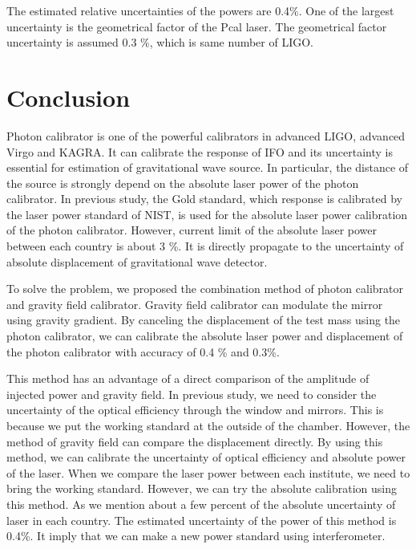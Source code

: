 \documentclass[A4]{spie}  %
\begin{document}
The estimated relative uncertainties of the powers are 0.4\%. One of the largest uncertainty is the geometrical factor of the Pcal laser. The geometrical factor uncertainty is assumed 0.3 \%, which is same number of LIGO. 

\section{Conclusion}
Photon calibrator is one of the powerful calibrators in advanced LIGO, advanced Virgo and KAGRA. It can calibrate the response of IFO and its uncertainty is essential for estimation of gravitational wave source. In particular, the distance of the source is strongly depend on the absolute laser power of the photon calibrator. In previous study, the Gold standard, which response is calibrated by the laser power standard of NIST, is used for the absolute laser power calibration of the photon calibrator. However, current limit of the absolute laser power between each country is about 3 \%. It is directly propagate to the uncertainty of absolute displacement of gravitational wave detector.

To solve the problem, we proposed the combination method of photon calibrator and gravity field calibrator. Gravity field calibrator can modulate the mirror using gravity gradient. By canceling the displacement of the test mass using the photon calibrator, we can calibrate the absolute laser power and displacement of the photon calibrator with accuracy of 0.4 \% and 0.3\%.

This method has an advantage of a direct comparison of the amplitude of injected power and gravity field. In previous study, we need to consider the uncertainty of the optical efficiency through the window and mirrors. This is because we put the working standard at the outside of the chamber. However, the method of gravity field can compare the displacement directly. By using this method, we can calibrate the uncertainty of optical efficiency and absolute power of the laser. When we compare the laser power between each institute, we need to bring the working standard. However, we can try the absolute calibration using this method. As we mention about a few percent of the absolute uncertainty of laser in each country. The estimated uncertainty of the power of this method is 0.4\%. It imply that we can make a new power standard using interferometer.
\acknowledgments     %
 
\end{document}
